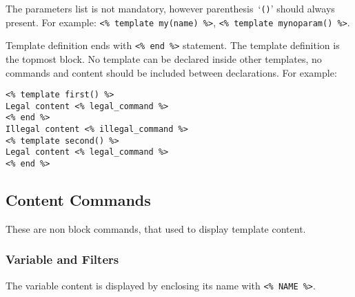 \documentclass{article}
\newcommand{\tw}[1]{\texttt{#1}}
\begin{document}
The parameters list is not mandatory, however parenthesis~`\tw{()}' should always present. 
For example: \verb+<% template my(name) %>+, \verb+<% template mynoparam() %>+.

Template definition ends with \verb+<% end %>+ statement. The template definition is the topmost block. No template can be declared inside other templates, no commands and content should be included between declarations. For example:

\begin{verbatim}
<% template first() %>
Legal content <% legal_command %>
<% end %>
Illegal content <% illegal_command %>
<% template second() %>
Legal content <% legal_command %>
<% end %>
\end{verbatim}

\subsection{Content Commands} 
These are non block commands, that used to display template content.

\subsubsection{Variable and Filters}
The variable content is displayed by enclosing its name with \verb+<% NAME %>+. 
\end{document}
